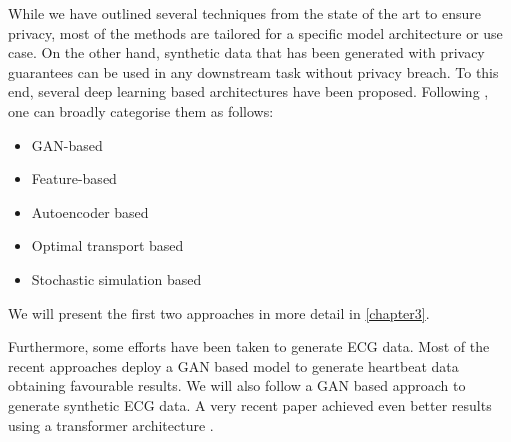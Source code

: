 While we have outlined several techniques from the state of the art to ensure privacy, most of the methods are tailored for a specific model architecture or use case. On the other hand, synthetic data that has been generated with privacy guarantees can be used in any downstream task without privacy breach. To this end, several deep learning based architectures have been proposed. Following \parencite{hu2023sok}, one can broadly categorise them as follows:
\begin{itemize}
    \item GAN-based
    \item Feature-based
    \item Autoencoder based {\tiny \Parencite[see e.g.][for a generator based on a variational autoencoder that is trained with DP-SGD]{vae}}
    \item Optimal transport based {\tiny \Parencite[see e.g.][for generator based on the so-called Sinkhorn divergence]{cao2021dont}}
    \item Stochastic simulation based {\tiny \Parencite[see e.g.][for a differentially-private diffusion model]{dpgen}}
\end{itemize}

We will present the first two approaches in more detail in \cref{chapter3}.

\phantom{asd}

Furthermore, some efforts have been taken to generate ECG data. Most of the recent approaches deploy a GAN based model to generate heartbeat data \Parencite[see e. g.][]{zhu2019electrocardiogram,Delaney2019SynthesisOR,wang2020accurate} obtaining favourable results. We will also follow a GAN based approach to generate synthetic ECG data. A very recent paper achieved even better results using a transformer architecture \Parencite[see][]{Kaleli2023GenerationOS}.  

